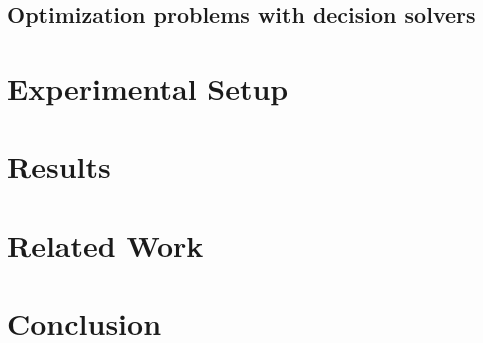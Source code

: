 \documentclass{sig-alternate}
\begin{document}
\subsection{Optimization problems with decision solvers}
\label{subsec:OptToDec}

\section{Experimental Setup}

\section{Results}

\section{Related Work}

\cite{alves2013resource}
\cite{abio2014encoding}
\cite{wu2013exploiting}
\cite{velev2009exploiting}
\cite{horbach2010boolean}
\cite{klein1999computing}
\cite{mingozzi1998exact}
\cite{sharma2011polynomial}
\cite{ramani2004breaking}
\cite{schutt2011explaining}
\cite{wille2008using}
\cite{malaguti2010survey}
\cite{cs395tGCtoSAT}

\section{Conclusion}



\end{document}

